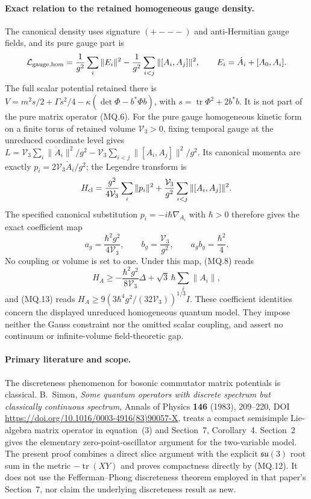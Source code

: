 \paragraph{Exact relation to the retained homogeneous gauge density.}
The canonical density uses signature $(+---)$ and anti-Hermitian
gauge fields, and its pure gauge part is
\[
 \mathcal L_{\rm gauge,hom}
 =\frac1{g^2}\sum_i\|E_i\|^2
       -\frac1{g^2}\sum_{i<j}\|[A_i,A_j]\|^2,\qquad
 E_i=\dot A_i+[A_0,A_i].
\]
The full scalar potential retained there is
$V=m^2s/2+\Gamma s^2/4-\kappa(\det\Phi-b^*\Phi b)$,
with $s=\operatorname{tr}\Phi^2+2b^*b$.
It is not part of the pure matrix operator (MQ.6).
For the pure gauge homogeneous kinetic form on a finite torus of
retained volume $\mathcal V_3>0$, fixing temporal gauge at the
unreduced coordinate level gives
$L=\mathcal V_3\sum_i\|\dot A_i\|^2/g^2
-\mathcal V_3\sum_{i<j}\|[A_i,A_j]\|^2/g^2$.
Its canonical momenta are exactly
$p_i=2\mathcal V_3\dot A_i/g^2$; the Legendre transform is
\[
 H_{\rm cl}=\frac{g^2}{4\mathcal V_3}\sum_i\|p_i\|^2
              +\frac{\mathcal V_3}{g^2}
                       \sum_{i<j}\|[A_i,A_j]\|^2.
\]
The specified canonical substitution $p_i=-i\hbar\nabla_{A_i}$
with $\hbar>0$ therefore gives the exact coefficient map
\[
 a_g=\frac{\hbar^2g^2}{4\mathcal V_3},\qquad
 b_g=\frac{\mathcal V_3}{g^2},\qquad
 a_gb_g=\frac{\hbar^2}{4}.                                  \tag{MQ.15}
\]
No coupling or volume is set to one. Under this map, (MQ.8) reads
\[
 H_A\geq-\frac{\hbar^2g^2}{8\mathcal V_3}\Delta
                   +\sqrt3\,\hbar\sum_i\|A_i\|,
\]
and (MQ.13) reads
$H_A\geq9(3\hbar^4g^2/(32\mathcal V_3))^{1/3}I$.
These coefficient identities concern the displayed unreduced
homogeneous quantum model. They impose neither the Gauss constraint
nor the omitted scalar coupling, and assert no continuum or
infinite-volume field-theoretic gap.

\paragraph{Primary literature and scope.}
The discreteness phenomenon for bosonic commutator matrix potentials
is classical. B.~Simon, \emph{Some quantum operators with discrete
spectrum but classically continuous spectrum}, Annals of Physics
\textbf{146} (1983), 209--220, DOI
\url{https://doi.org/10.1016/0003-4916(83)90057-X}, treats a
compact semisimple Lie-algebra matrix operator in equation~(3)
and Section~7, Corollary~4. Section~2 gives the elementary
zero-point-oscillator argument for the two-variable model.
The present proof combines a direct slice argument with the
explicit $\mathfrak{su}(3)$ root sum in the metric
$-\operatorname{tr}(XY)$ and proves compactness directly by
(MQ.12). It does not use the Fefferman--Phong discreteness theorem
employed in that paper's Section~7, nor claim the underlying
discreteness result as new.

